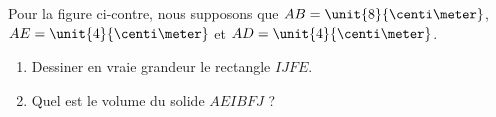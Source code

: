 
\begin{exercice}\label{exoSeconde-0097}


    \begin{multicols}{2}
        Pour la figure ci-contre, nous supposons que \( AB=\unit{8}{\centi\meter}\), \( AE=\unit{4}{\centi\meter}\) et \( AD=\unit{4}{\centi\meter}\).
        \begin{enumerate}
            \item
                Dessiner en vraie grandeur le rectangle \( IJFE\).
            \item
                Quel est le volume du solide \( AEIBFJ\) ?
        \end{enumerate}

        \columnbreak

        \begin{center}

        \end{center}
    \end{multicols}




\end{exercice}
